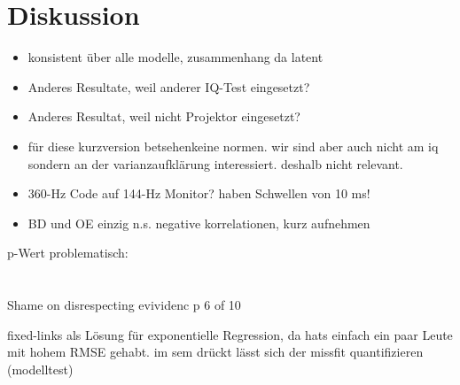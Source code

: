 \documentclass[11pt, twoside, a4paper]{book}		%
\begin{document}
\chapter{Diskussion \label{cha:Diskussion}}
\begin{itemize}
	\item konsistent über alle modelle, zusammenhang da latent
	\item Anderes Resultate, weil anderer IQ-Test eingesetzt?
	\item Anderes Resultat, weil nicht Projektor eingesetzt?
	\item für diese kurzversion betsehenkeine normen. wir sind aber auch nicht am iq sondern an der varianzaufklärung interessiert. deshalb nicht relevant.
	\item 360-Hz Code auf 144-Hz Monitor? \citet{Lappin2009, Tadin2006} haben Schwellen von 10 ms!
	\item BD und OE einzig n.s. negative korrelationen, kurz aufnehmen
\end{itemize}


p-Wert problematisch:\\
\citet{Gelman2006}\\
\citet{Wasserstein2016}\\
\citet{Nuzzo2014}
\citet{Hayduk2014} Shame on disrespecting evividenc p 6 of 10


fixed-links als Lösung für exponentielle Regression, da hats einfach ein paar Leute mit hohem RMSE gehabt. im sem drückt lässt sich der missfit quantifizieren (modelltest)





\printglossaries	%


\renewcommand\bibname{Literatur}				%
\end{document}
